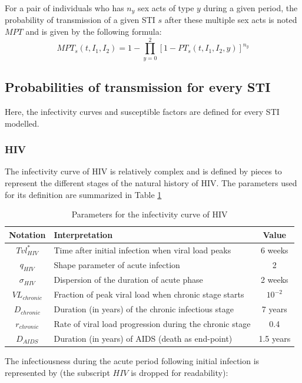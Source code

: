 \documentclass[11pt, onecolumn]{article}
\begin{document}
For a pair of individuals who has $n_{y}$ sex acts of type $y$ during a given period, the probability of transmission of a given STI $s$ after these multiple sex acts is noted $MPT$ and is given by the following formula:
$$ MPT_s(t,I_1,I_2) = 1- \prod_{y=0}^{2}[1-PT_s(t,I_1,I_2,y)]^{n_y} $$


\subsection{Probabilities of transmission for every STI}
\label{sec:probaTransmission}
Here, the infectivity curves and susceptible factors are defined for every STI modelled.

\subsubsection{HIV}
The infectivity curve of HIV is relatively complex and is defined by pieces to represent the different stages of the natural history of HIV. The parameters used for its definition are summarized in Table \ref{table:ICHIV}

\begin{table}[htdp]
\caption{Parameters for the infectivity curve of HIV}
\begin{center}
\begin{tabular}{clc}
\hline
\textbf{Notation} & \textbf{Interpretation} & \textbf{Value} \\
\hline
\hline
$Tvl^*_{HIV}$ & Time after initial infection when viral load peaks & 6 weeks\\
$q_{HIV}$ & Shape parameter of acute infection & 2 \\
$\sigma_{HIV}$ & Dispersion of the duration of acute phase & 2 weeks \\
$VL_{chronic}$ & Fraction of peak viral load when chronic stage starts  & $10^{-2}$ \\
$D_{chronic}$ & Duration (in years) of the chronic infectious stage & 7 years \\
$r_{chronic}$ & Rate of viral load progression during the chronic stage & 0.4 \\
$D_{AIDS}$ & Duration (in years) of AIDS (death as end-point) & 1.5 years \\
\hline
\end{tabular}
\end{center}
\label{table:ICHIV}
\end{table}

The infectiousness during the acute period following initial infection is represented by (the subscript $HIV$ is dropped for readability):
\end{document}
